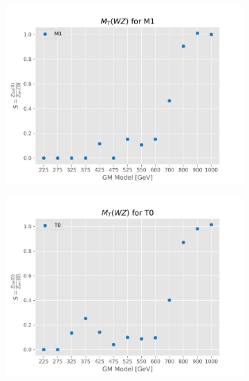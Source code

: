 \documentclass[../Bachelorarbeit.tex]{subfiles}
\begin{document}
\begin{figure}[h]
\begin{subfigure}{0.45\textwidth}
        \includegraphics[width=\textwidth]{Plots/gm_relevanze/MTWZ_op_M1.png}
        \caption{}
    \end{subfigure}
    \begin{subfigure}{0.45\textwidth}
        \includegraphics[width=\textwidth]{Plots/gm_relevanze/MTWZ_op_T0.png}
        \caption{}
    \end{subfigure}
    \begin{subfigure}{0.45\textwidth}

\end{subfigure}
\end{figure}
\end{document}
